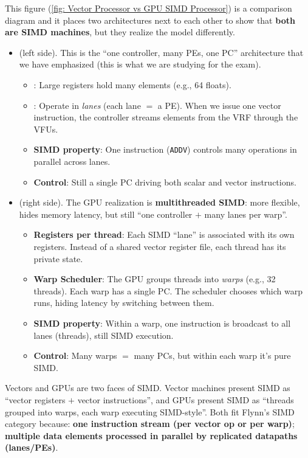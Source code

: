 \noindent
This figure (\ref{fig: Vector Processor vs GPU SIMD Processor}) is a comparison diagram and it places two architectures next to each other to show that \textbf{both are SIMD machines}, but they realize the model differently.
\begin{itemize}
    \item {} (left side). This is the ``one controller, many PEs, one PC'' architecture that we have emphasized (this is what we are studying for the exam).
    \begin{itemize}
        \item {}: Large registers hold many elements (e.g., 64 floats).
        \item {}: Operate in \emph{lanes} (each lane $=$ a PE). When we issue one vector instruction, the controller streams elements from the VRF through the VFUs.
        \item \textbf{SIMD property}: One instruction (\texttt{ADDV}) controls many operations in parallel across lanes.
        \item \textbf{Control}: Still a single PC driving both scalar and vector instructions.
    \end{itemize}
    \item {} (right side). The GPU realization is \textbf{multithreaded SIMD}: more flexible, hides memory latency, but still ``one controller $+$ many lanes per warp''.
    \begin{itemize}
        \item \textbf{Registers per thread}: Each SIMD ``lane'' is associated with its own registers. Instead of a shared vector register file, each thread has its private state.
        \item \textbf{Warp Scheduler}: The GPU groups threads into \emph{warps} (e.g., 32 threads). Each warp has a single PC. The scheduler chooses which warp runs, hiding latency by switching between them.
        \item \textbf{SIMD property}: Within a warp, one instruction is broadcast to all lanes (threads), still SIMD execution.
        \item \textbf{Control}: Many warps $=$ many PCs, but within each warp it's pure SIMD.
    \end{itemize}
\end{itemize}
Vectors and GPUs are two faces of SIMD. Vector machines present SIMD as ``vector registers $+$ vector instructions'', and GPUs present SIMD as ``threads grouped into warps, each warp executing SIMD-style''. Both fit Flynn's SIMD category because: \textbf{one instruction stream (per vector op or per warp)}; \textbf{multiple data elements processed in parallel by replicated datapaths (lanes/PEs)}.